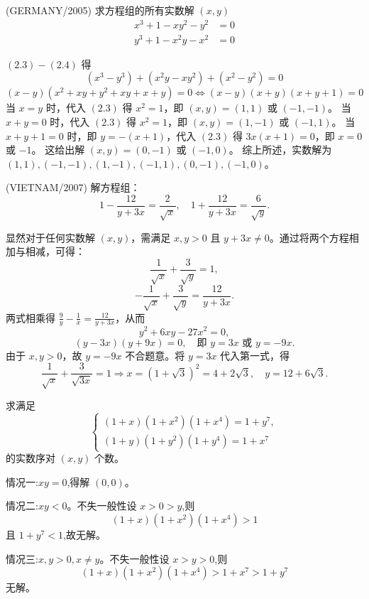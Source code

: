 \begin{questions}
\question (GERMANY/2005) 求方程组的所有实数解 $(x, y)$
\begin{align}
x^3 + 1 - xy^2 - y^2 &= 0 \tag{2.3} \\
y^3 + 1 - x^2y - x^2 &= 0 \tag{2.4}
\end{align}

\begin{solution}
$(2.3) - (2.4)$ 得
\[
(x^3 - y^3) + (x^2y - xy^2) + (x^2 - y^2) = 0
\]
\[
(x - y)(x^2 + xy + y^2 + xy + x + y) = 0 \iff (x - y)(x + y)(x + y + 1) = 0
\]
当 $x = y$ 时，代入 $(2.3)$ 得 $x^2 = 1$，即 $(x, y) = (1, 1)$ 或 $(-1, -1)$。
当 $x + y = 0$ 时，代入 $(2.3)$ 得 $x^2 = 1$，即 $(x, y) = (1, -1)$ 或 $(-1, 1)$。
当 $x + y + 1 = 0$ 时，即 $y = -(x + 1)$，代入 $(2.3)$ 得 $3x(x + 1) = 0$，即 $x = 0$ 或 $-1$。
这给出解 $(x, y) = (0, -1)$ 或 $(-1, 0)$。
综上所述，实数解为 $(1, 1), (-1, -1), (1, -1), (-1, 1), (0, -1), (-1, 0)$。
\end{solution}

    \question (VIETNAM/2007) 解方程组：
\[
1 - \frac{12}{y + 3x} = \frac{2}{\sqrt{x}}, \quad 1 + \frac{12}{y + 3x} = \frac{6}{\sqrt{y}}.
\]

\begin{solution}
显然对于任何实数解 $(x, y)$，需满足 $x, y > 0$ 且 $y + 3x \neq 0$。通过将两个方程相加与相减，可得：
\[
\frac{1}{\sqrt{x}} + \frac{3}{\sqrt{y}} = 1,
\]
\[
-\frac{1}{\sqrt{x}} + \frac{3}{\sqrt{y}} = \frac{12}{y + 3x}.
\]
两式相乘得 $\frac{9}{y} - \frac{1}{x} = \frac{12}{y + 3x}$，从而
\[
y^2 + 6xy - 27x^2 = 0,
\]
\[
(y - 3x)(y + 9x) = 0, \quad \text{即 } y = 3x \text{ 或 } y = -9x.
\]
由于 $x, y > 0$，故 $y = -9x$ 不合题意。将 $y = 3x$ 代入第一式，得
\[
\frac{1}{\sqrt{x}} + \frac{3}{\sqrt{3x}} = 1 \Rightarrow x = \left( 1 + \sqrt{3} \right)^2 = 4 + 2\sqrt{3}, \quad y = 12 + 6\sqrt{3}.
\]
\end{solution}

    \question 求满足
    \[
    \begin{cases}
    (1+x)(1+x^2)(1+x^4) = 1+y^7,\\
    (1+y)(1+y^2)(1+y^4) = 1+x^7
    \end{cases}
    \]
    的实数序对 $(x,y)$ 个数。
    \begin{solution}
        情况一:$xy=0$,得解 $(0,0)$。  

        情况二:$xy<0$。不失一般性设 $x>0>y$,则 
        \[(1+x)(1+x^2)(1+x^4) > 1
        \]
        且 $1+y^7 < 1$,故无解。  

        情况三:$x,y>0, x \ne y$。不失一般性设 $x>y>0$,则
        \[
        (1+x)(1+x^2)(1+x^4) > 1+x^7 > 1+y^7
        \]
        无解。  


\end{solution}
\end{questions}
